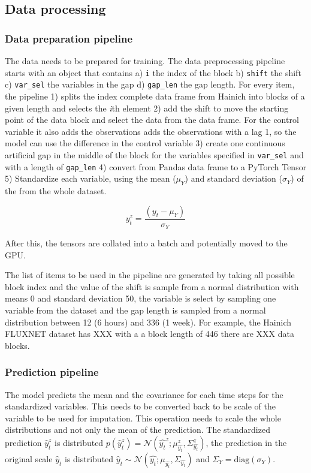 \documentclass{article}
\newcommand{\norm}[3]{\mathcal{N}\left(#1; #2, #3\right)} %
\let\Oldsubsection\subsection
\renewcommand{\subsection}{\FloatBarrier\Oldsubsection}
\begin{document}
\subsection{Data processing}

\subsubsection{Data preparation pipeline}

The data needs to be prepared for training. The data preprocessing pipeline starts with an object that contains a) \verb|i| the index of the block b) \verb|shift|  the shift c) \verb|var_sel| the variables in the gap d) \verb|gap_len| the gap length. For every item, the pipeline 1) splits the index complete data frame from Hainich into blocks of a given length and selects the \textit{i}th element  2) add the shift to move the starting point of the data block and select the data from the data frame. For the control variable it also adds the observations adds the observations with a lag 1, so the model can use the difference in the control variable 3) create one continuous artificial gap in the middle of the block for the variables specified in \verb|var_sel| and with a length of \verb|gap_len| 4) convert from Pandas data frame to a PyTorch Tensor 5) Standardize each variable, using the mean ($\mu_Y$) and standard deviation ($\sigma_Y$) of the from the whole dataset.

\begin{equation}\label{standardized}
    y^z_t = \frac{(y_t - \mu_Y)}{\sigma_Y}
\end{equation}

After this, the tensors are collated into a batch and potentially moved to the GPU.

The list of items to be used in the pipeline are generated by taking all possible block index and the value of the shift is sample from a normal distribution with means 0 and standard deviation 50, the variable is select by sampling one variable from the dataset and the gap length is sampled from a normal distribution between 12 (6 hours) and 336 (1 week). For example, the Hainich FLUXNET dataset has XXX with a a block length of 446 there are XXX data blocks.

\subsubsection{Prediction pipeline}

The model predicts the mean and the covariance for each time steps for the standardized variables. This needs to be converted back to be scale of the variable to be used for imputation. This operation needs to scale the whole distributions and not only the mean of the prediction. The standardized prediction $\hat{y}^z_t$ is distributed $p(\hat{y}^z_t) = \norm{\hat{y_t}^z}{\mu^z_{\hat{y_t}}}{\Sigma^z_{\hat{y_t}}}$, the prediction in the original scale $\hat{y}_t$ is distributed $\hat{y}_t \sim \norm{\hat{y_t}}{\mu_{\hat{y_t}}}{\Sigma_{\hat{y_t}}}$ and $\Sigma_Y = \text{diag}(\sigma_Y)$. 
\end{document}
